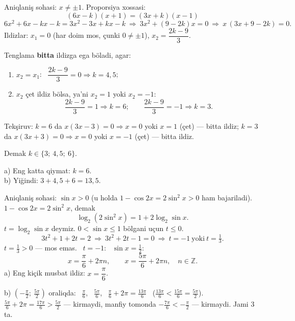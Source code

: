 \newpage
{}
Aniqlaniş sohasi: $x\ne\pm1$. Proporsiya xossasi:
\[(6x-k)(x+1)=(3x+k)(x-1)\]
\[6x^2+6x-kx-k=3x^2-3x+kx-k\ \Rightarrow\ 3x^2+(9-2k)x=0\ \Rightarrow\ x\,(3x+9-2k)=0.\]
Ildizlar: \quad $x_1=0$ (har doim mos, çunki $0\ne\pm1$), \quad $x_2=\dfrac{2k-9}{3}$.

Tenglama \textbf{bitta} ildizga ega böladi, agar:
\begin{enumerate}\setlength{\itemsep}{2pt}
\item $x_2=x_1$: \ $\dfrac{2k-9}{3}=0\Rightarrow k=4{,}5$;
\item $x_2$ çet ildiz bölsa, ya'ni $x_2=1$ yoki $x_2=-1$:
\[\frac{2k-9}{3}=1\Rightarrow k=6;\qquad \frac{2k-9}{3}=-1\Rightarrow k=3.\]
\end{enumerate}
Tekşiruv: $k=6$ da $x(3x-3)=0\Rightarrow x=0$ yoki $x=1$ (çet) — bitta ildiz; $k=3$ da $x(3x+3)=0\Rightarrow x=0$ yoki $x=-1$ (çet) — bitta ildiz.

Demak $k\in\{3;\ 4{,}5;\ 6\}$.

a) Eng katta qiymat: $k=6$.\\
b) Yiğindi: $3+4{,}5+6=13{,}5$.

\newpage
{}
Aniqlaniş sohasi: $\sin x>0$ (u holda $1-\cos2x=2\sin^2x>0$ ham bajariladi).\\
$1-\cos2x=2\sin^2x$, demak
\[\log_2(2\sin^2x)=1+2\log_2\sin x.\]
$t=\log_2\sin x$ deymiz. $0<\sin x\le1$ bölgani uçun $t\le0$.
\[3t^2+1+2t=2\ \Rightarrow\ 3t^2+2t-1=0\ \Rightarrow\ t=-1\ \text{yoki}\ t=\tfrac13.\]
$t=\frac13>0$ — mos emas. \ $t=-1$: \ $\sin x=\frac12$:
\[x=\frac\pi6+2\pi n,\qquad x=\frac{5\pi}6+2\pi n,\quad n\in\mathbb Z.\]
a) Eng kiçik musbat ildiz: $x=\dfrac\pi6$.

b) $\left(-\frac\pi2;\ \frac{5\pi}2\right)$ oraliqda: \ $\frac\pi6$, \ $\frac{5\pi}6$, \ $\frac\pi6+2\pi=\frac{13\pi}6$ \ ($\frac{13\pi}6<\frac{15\pi}6=\frac{5\pi}{2}$). \ $\frac{5\pi}6+2\pi=\frac{17\pi}6>\frac{5\pi}2$ — kirmaydi, manfiy tomonda $-\frac{7\pi}{6}<-\frac{\pi}{2}$ — kirmaydi. Jami 3 ta.

